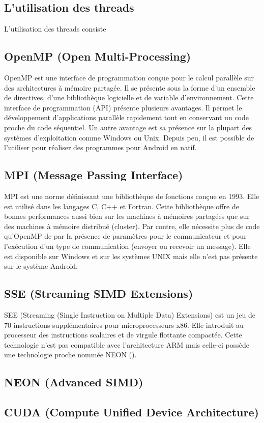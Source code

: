 \subsection{ L'utilisation des threads }

L'utilisation des threads consiste 

\subsection{ OpenMP (Open Multi-Processing) }

OpenMP est une interface de programmation conçue pour le calcul parallèle sur des architectures à mémoire partagée. Il se présente sous la forme d'un ensemble de directives, d'une bibliothèque logicielle et de variable d'environnement. Cette interface de programmation (API) présente plusieurs avantages. Il permet le développement d'applications parallèle rapidement tout en conservant un code proche du code séquentiel.
Un autre avantage est sa présence sur la plupart des systèmes d'exploitation comme Windows ou Unix. Depuis peu, il est possible de l'utiliser pour réaliser des programmes pour Android en natif.

\subsection{ MPI (Message Passing Interface) } 

MPI est une norme définissant une bibliothèque de fonctions conçue en 1993. Elle est utilisé dans les langages C, C++ et Fortran. Cette bibliothèque offre de bonnes performances aussi bien sur les machines à mémoires partagées que sur des machines à mémoire distribué (cluster). Par contre, elle nécessite plus de code qu'OpenMP de par la présence de paramètres pour le communicateur et pour l'exécution d'un type de communication (envoyer ou recevoir un message). Elle est disponible sur Windows et sur les systèmes UNIX mais elle n'est pas présente sur le système Android.

\subsection{ SSE (Streaming SIMD Extensions) }

SEE (Streaming (Single Instruction on Multiple Data) Extensions) est un jeu de 70 instructions supplémentaires pour microprocesseurs x86. Elle introduit au processeur des instructions scalaires et de virgule flottante compactée. Cette technologie n'est pas compatible avec l'architecture ARM mais celle-ci possède une technologie proche nommée NEON (). 

\subsection{ NEON (Advanced SIMD) }



\subsection{ CUDA (Compute Unified Device Architecture) }

       

 




 



